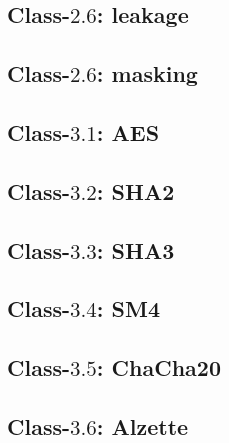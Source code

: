 
\subsection{Class-$2.6$: leakage}
\label{appx:instr_equiv:2:6}


\subsection{Class-$2.6$: masking}
\label{appx:instr_equiv:2:7}


\subsection{Class-$3.1$: AES}
\label{appx:instr_equiv:3:1}


\subsection{Class-$3.2$: SHA2}
\label{appx:instr_equiv:3:2}


\subsection{Class-$3.3$: SHA3}
\label{appx:instr_equiv:3:3}


\subsection{Class-$3.4$: SM4}
\label{appx:instr_equiv:3:4}


\subsection{Class-$3.5$: ChaCha20}
\label{appx:instr_equiv:3:5}


\subsection{Class-$3.6$: Alzette}
\label{appx:instr_equiv:3:6}

